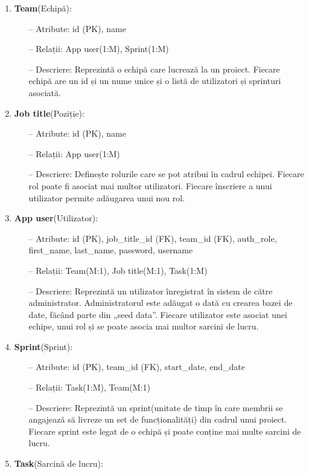 \begin{enumerate}
 	 \item \textbf{Team}(Echipă):
\begin{itemize}
\item[--] Atribute: id (PK), name
\item[--] Relații: App user(1:M), Sprint(1:M)
\item[--] Descriere: Reprezintă o echipă care lucrează la un proiect. Fiecare echipă are un id și un nume unice și o listă de utilizatori și sprinturi asociată.
\end{itemize}
	\item \textbf{Job title}(Poziție):
\begin{itemize}
\item[--] Atribute: id (PK), name
\item[--] Relații: App user(1:M)
\item[--] Descriere: Definește rolurile care se pot atribui în cadrul echipei. Fiecare rol poate fi asociat mai multor utilizatori. Fiecare înscriere a unui utilizator permite adăugarea unui nou rol.
\end{itemize}
	\item \textbf{App user}(Utilizator):
\begin{itemize}
\item[--] Atribute: id (PK), job_title_id (FK), team_id (FK), auth_role, first_name, last_name, password, username
\item[--] Relații: Team(M:1), Job title(M:1), Task(1:M)
\item[--] Descriere: Reprezintă un utilizator înregistrat în sistem de către administrator. Administratorul este adăugat o dată cu crearea bazei de date, făcând parte din „seed data”. Fiecare utilizator este asociat unei echipe, unui rol și se poate asocia mai multor sarcini de lucru.
\end{itemize}
	\item \textbf{Sprint}(Sprint):
\begin{itemize}
\item[--] Atribute: id (PK), team_id (FK), start_date, end_date
\item[--] Relații: Task(1:M), Team(M:1)
\item[--] Descriere: Reprezintă un sprint(unitate de timp în care membrii se angajează să livreze un set de funcționalități) din cadrul unui proiect. Fiecare sprint este legat de o echipă și poate conține mai multe sarcini de lucru.
\end{itemize}
	\item \textbf{Task}(Sarcină de lucru): 

\end{enumerate}
